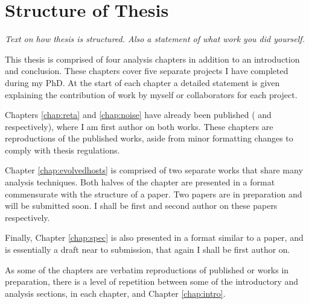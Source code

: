 \chapter*{Structure of Thesis}\label{chap:struct}
\textit{Text on how thesis is structured. Also a statement of what work you did yourself.}%

This thesis is comprised of four analysis chapters in addition to an introduction and conclusion. These chapters cover five separate projects I have completed during my PhD. At the start of each chapter a detailed statement is given explaining the contribution of work by myself or collaborators for each project. 

Chapters \ref{chap:reta} and \ref{chap:noise} have already been published (\citealt{2017North_reta} and \citealt{2017North} respectively), where I am first author on both works. These chapters are reproductions of the published works, aside from minor formatting changes to comply with thesis regulations. 

Chapter \ref{chap:evolvedhosts} is comprised of two separate works that share many analysis techniques. Both halves of the chapter are presented in a format commensurate with the structure of a paper. Two papers are in preparation and will be submitted soon. I shall be first and second author on these papers respectively.

Finally, Chapter \ref{chap:spec} is also presented in a format similar to a paper, and is essentially a draft near to submission, that again I shall be first author on. 

As some of the chapters are verbatim reproductions of published or works in preparation, there is a level of repetition between some of the introductory and analysis sections, in each chapter, and Chapter \ref{chap:intro}. 
 